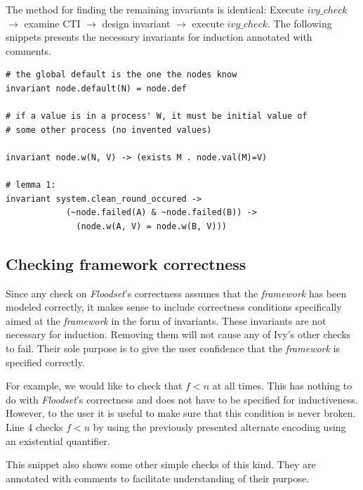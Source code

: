 \documentclass[fleqn]{article}
\begin{document}
The method for finding the remaining invariants is identical: Execute $ivy\_check$ $\rightarrow$ examine CTI $\rightarrow$ design invariant $\rightarrow$ execute $ivy\_check$. The following snippets presents the necessary invariants for induction annotated with comments.
\begin{mdframed}[nobreak=true, backgroundcolor=light-gray, roundcorner=10pt,leftmargin=1, rightmargin=1, innerleftmargin=15, innertopmargin=15,innerbottommargin=15, outerlinewidth=1, linecolor=light-gray]
\begin{lstlisting}
# the global default is the one the nodes know
invariant node.default(N) = node.def

# if a value is in a process' W, it must be initial value of
# some other process (no invented values)

invariant node.w(N, V) -> (exists M . node.val(M)=V)

# lemma 1:
invariant system.clean_round_occured ->
            (~node.failed(A) & ~node.failed(B)) ->
              (node.w(A, V) = node.w(B, V)))
\end{lstlisting}
\end{mdframed}

\subsection{Checking framework correctness}

Since any check on \textit{Floodset}'s correctness assumes that the \textit{framework} has been modeled correctly, it makes sense to include correctness conditions specifically aimed at the \textit{framework} in the form of invariants. These invariants are not necessary for induction. Removing them will not cause any of Ivy's other checks to fail. Their sole purpose is to give the user confidence that the \textit{framework} is specified correctly.

For example, we would like to check that $f < n$ at all times. This has nothing to do with \textit{Floodset}'s correctness and does not have to be specified for inductiveness. However, to the user it is useful to make sure that this condition is never broken. Line 4 checks $f < n$ by using the previously presented alternate encoding using an existential quantifier.

This snippet also shows some other simple checks of this kind. They are annotated with comments to facilitate understanding of their purpose.
\end{document}
